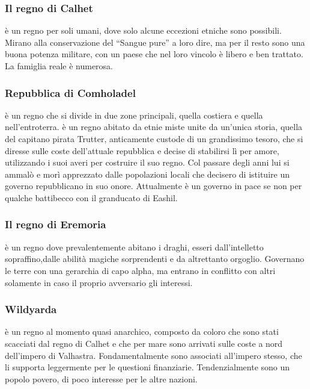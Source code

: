 \documentclass[a4paper,12pt]{book}
\begin{document}
\subsubsection{Il regno di Calhet}

è un regno per soli umani, dove solo alcune eccezioni etniche sono possibili. Mirano alla conservazione del ``Sangue pure'' a loro dire, ma per il resto sono una buona potenza militare, con un paese che nel loro vincolo è libero e ben trattato.
La famiglia reale è numerosa.

\subsubsection{Repubblica di Comholadel}

è un regno che si divide in due zone principali, quella costiera e quella nell'entroterra.
è un regno abitato da etnie miste unite da un'unica storia, quella del capitano pirata  Trutter, anticamente custode di un grandissimo tesoro, che si diresse sulle coste dell'attuale repubblica e decise di stabilirsi lì per amore, utilizzando i suoi averi per costruire il suo regno.
Col passare degli anni lui si ammalò e morì apprezzato dalle popolazioni locali che decisero di istituire un governo repubblicano in suo onore.
Attualmente è un governo in pace se non per qualche battibecco con il granducato di Eashil.

\subsubsection{Il regno di Eremoria}

è un regno dove prevalentemente abitano i draghi, esseri dall'intelletto sopraffino,dalle abilità magiche sorprendenti e da altrettanto orgoglio.
Governano le terre con una gerarchia di capo alpha, ma entrano in conflitto con altri solamente in caso il proprio avversario gli interessi.

\subsubsection{Wildyarda}

è un regno al momento quasi anarchico, composto da coloro che sono stati scacciati dal regno di Calhet e che per mare sono arrivati sulle coste a nord dell'impero di Valhastra.
Fondamentalmente sono associati all'impero stesso, che li supporta leggermente per le questioni finanziarie.
Tendenzialmente sono un popolo povero, di poco interesse per le altre nazioni.
\end{document}
